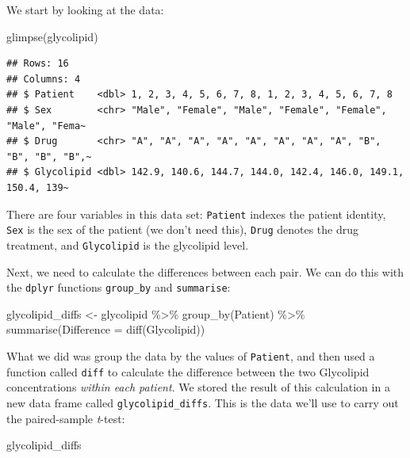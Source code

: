 \documentclass[
]{book}
\newenvironment{Shaded}{\begin{snugshade}}{\end{snugshade}}
\newcommand{\AttributeTok}[1]{\textcolor[rgb]{0.77,0.63,0.00}{#1}}
\newcommand{\FunctionTok}[1]{\textcolor[rgb]{0.00,0.00,0.00}{#1}}
\newcommand{\NormalTok}[1]{#1}
\newcommand{\OtherTok}[1]{\textcolor[rgb]{0.56,0.35,0.01}{#1}}
\newcommand{\SpecialCharTok}[1]{\textcolor[rgb]{0.00,0.00,0.00}{#1}}
\begin{document}
We start by looking at the data:

\begin{Shaded}
\begin{Highlighting}[]
\FunctionTok{glimpse}\NormalTok{(glycolipid)}
\end{Highlighting}
\end{Shaded}

\begin{verbatim}
## Rows: 16
## Columns: 4
## $ Patient    <dbl> 1, 2, 3, 4, 5, 6, 7, 8, 1, 2, 3, 4, 5, 6, 7, 8
## $ Sex        <chr> "Male", "Female", "Male", "Female", "Female", "Male", "Fema~
## $ Drug       <chr> "A", "A", "A", "A", "A", "A", "A", "A", "B", "B", "B", "B",~
## $ Glycolipid <dbl> 142.9, 140.6, 144.7, 144.0, 142.4, 146.0, 149.1, 150.4, 139~
\end{verbatim}

There are four variables in this data set: \texttt{Patient} indexes the patient identity, \texttt{Sex} is the sex of the patient (we don't need this), \texttt{Drug} denotes the drug treatment, and \texttt{Glycolipid} is the glycolipid level.

Next, we need to calculate the differences between each pair. We can do this with the \texttt{dplyr} functions \texttt{group\_by} and \texttt{summarise}:

\begin{Shaded}
\begin{Highlighting}[]
\NormalTok{glycolipid\_diffs }\OtherTok{\textless{}{-}} 
\NormalTok{  glycolipid }\SpecialCharTok{\%\textgreater{}\%}
  \FunctionTok{group\_by}\NormalTok{(Patient) }\SpecialCharTok{\%\textgreater{}\%}
  \FunctionTok{summarise}\NormalTok{(}\AttributeTok{Difference =} \FunctionTok{diff}\NormalTok{(Glycolipid))}
\end{Highlighting}
\end{Shaded}

What we did was group the data by the values of \texttt{Patient}, and then used a function called \texttt{diff} to calculate the difference between the two Glycolipid concentrations \emph{within each patient}. We stored the result of this calculation in a new data frame called \texttt{glycolipid\_diffs}. This is the data we'll use to carry out the paired-sample \emph{t}-test:

\begin{Shaded}
\begin{Highlighting}[]
\NormalTok{glycolipid\_diffs}
\end{Highlighting}
\end{Shaded}
\end{document}
